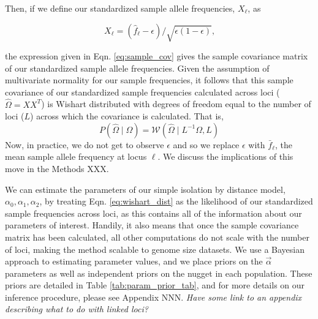 \documentclass[12pt]{article}
\newcommand{\gc}[1]{{\em \color{blue} #1}}
\begin{document}
Then, if we define our standardized sample allele frequencies, $X_\ell$, as

\begin{equation}
\label{eq:standardized_sample_freqs}
X_\ell = (\hat{f}_{\ell}  - \epsilon)/\sqrt{\epsilon(1-\epsilon)}\text{,}
\end{equation}

the expression given in Eqn. \eqref{eq:sample_cov} gives the sample covariance matrix of our standardized sample allele frequencies.
Given the assumption of multivariate normality for our sample frequencies, it follows that this sample covariance of our standardized sample frequencies calculated across loci ($\widehat{\Omega} = X X^T$) is Wishart distributed with degrees of freedom equal to the number of loci ($L$) across which the covariance is calculated.
That is, 
\begin{equation}
\label{eq:wishart_dist}
P(\widehat{\Omega} \mid \Omega) = \mathcal{W}\left(\widehat{\Omega} \mid L^{-1} \Omega,L \right)
\end{equation}
Now, in practice, we do not get to observe $\epsilon$ and so we replace $\epsilon$ with $\bar{f}_{\ell}$, the mean sample allele frequency at locus  $\ell$. We discuss the implications of this move in the Methods XXX.

We can estimate the parameters of our simple isolation by distance model, $\alpha_0,\alpha_1, \alpha_2$, by treating Eqn. \eqref{eq:wishart_dist} as the likelihood of our standardized sample frequencies across loci, as this contains all of the information about our parameters of interest.  Handily, it also means that once the sample covariance matrix has been calculated, all other computations do not scale with the number of loci, making the method scalable to genome size datasets.  We use a Bayesian approach to estimating parameter values, and we place priors on the $\vec{\alpha}$ parameters as well as independent priors on the nugget in each population. These priors are detailed in Table \ref{tab:param_prior_tab}, and for more details on our inference procedure, please see Appendix NNN.  \gc{Have some link to an appendix describing what to do with linked loci?}
\end{document}
